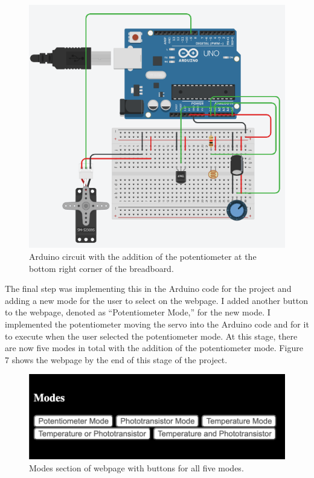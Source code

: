 \documentclass[10pt,twocolumn]{article}
\begin{document}
\begin{figure}
    \centering
    \includegraphics[width=.95\linewidth]{Figure 6.png}
    \caption{
        Arduino circuit with the addition of the potentiometer at the bottom right corner of the breadboard.
    }
    \label{fig:fig6}
\end{figure}

The final step was implementing this in the Arduino code for the project and adding a new mode for the user to select on the webpage. I added another button to the webpage, denoted as “Potentiometer Mode,” for the new mode. I implemented the potentiometer moving the servo into the Arduino code and for it to execute when the user selected the potentiometer mode. At this stage, there are now five modes in total with the addition of the potentiometer mode. Figure 7 shows the webpage by the end of this stage of the project.

\begin{figure}
    \centering
    \includegraphics[width=.95\linewidth]{Figure 7.png}
    \caption{
        Modes section of webpage with buttons for all five modes. 
    }
    \label{fig:fig7}
\end{figure}
\end{document}
